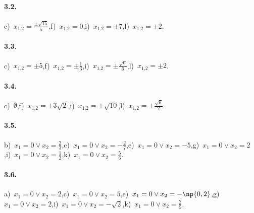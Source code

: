 \paragraph{3.2.} c)~$x_{1\text{,}2} = \frac{\pm \sqrt{15}}{5}$,\quad f)~$x_{1\text{,}2} = 0$,\quad i)~$x_{1\text{,}2} = \pm 7$,\quad l)~$x_{1\text{,}2} = \pm 2$.

\paragraph{3.3.} c)~$x_{1\text{,}2} = \pm 5$,\quad f)~$x_{1\text{,}2} = \pm \frac{1}{3}$,\quad i)~$x_{1\text{,}2} = \pm \frac{\sqrt{6}}{6}$,\quad l)~$x_{1\text{,}2} = \pm 2$.

\paragraph{3.4.} c)~$\emptyset$,\quad f)~$x_{1\text{,}2} = \pm 3 \sqrt{2}$,\quad i)~$x_{1\text{,}2} = \pm \sqrt{10}$,\quad l)~$x_{1\text{,}2} = \pm \frac{\sqrt{6}}{2}$.

\paragraph{3.5.} b)~$x_{1} = 0 \vee x_{2} = \frac{2}{3}$,\quad c)~$x_{1} = 0 \vee x_{2} = - \frac{2}{7}$,\quad e)~$x_{1} = 0 \vee x_{2} = - 5$,\quad g)~$x_{1} = 0 \vee x_{2} = 2$,\quad i)~$x_{1} = 0 \vee x_{2} = \frac{1}{2}$,\quad k)~$x_{1} = 0 \vee x_{2} = \frac{5}{6}$.


\paragraph{3.6.} a)~$x_{1} = 0 \vee x_{2} = 2$,\quad c)~$x_{1} = 0 \vee x_{2} = 5$,\quad e)~$x_{1} = 0 \vee x_{2} = - \np{0,2}$,\quad g)~$x_{1} = 0 \vee x_{2} = 2$,\quad i)~$x_{1} = 0 \vee x_{2} = - \sqrt{2}$,\quad k)~$x_{1} = 0 \vee x_{2} = \frac{2}{5}$.


